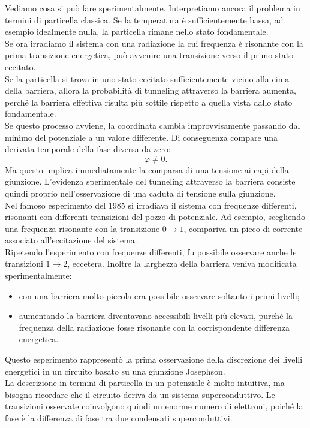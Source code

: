 Vediamo cosa si può fare sperimentalmente. Interpretiamo ancora il problema in termini di particella classica. Se la temperatura è sufficientemente bassa, ad esempio idealmente nulla, la particella rimane nello stato fondamentale.\\
Se ora irradiamo il sistema con una radiazione la cui frequenza è risonante con la prima transizione energetica, può avvenire una transizione verso il primo stato eccitato.\\
Se la particella si trova in uno stato eccitato sufficientemente vicino alla cima della barriera, allora la probabilità di tunneling attraverso la barriera aumenta, perché la barriera effettiva risulta più sottile rispetto a quella vista dallo stato fondamentale.\\
Se questo processo avviene, la coordinata cambia improvvisamente passando dal minimo del potenziale a un valore differente. Di conseguenza compare una derivata temporale della fase diversa da zero:
\[
\dot{\varphi}\neq0.
\]
Ma questo implica immediatamente la comparsa di una tensione ai capi della giunzione. L'evidenza sperimentale del tunneling attraverso la barriera consiste quindi proprio nell'osservazione di una caduta di tensione sulla giunzione.\\
Nel famoso esperimento del 1985 si irradiava il sistema con frequenze differenti, risonanti con differenti transizioni del pozzo di potenziale. Ad esempio, scegliendo una frequenza risonante con la transizione $0\to1$, compariva un picco di corrente associato all'eccitazione del sistema.\\
Ripetendo l'esperimento con frequenze differenti, fu possibile osservare anche le transizioni $1\to2$, eccetera. Inoltre la larghezza della barriera veniva modificata sperimentalmente:
\begin{itemize}[leftmargin=0.5cm]
    \item con una barriera molto piccola era possibile osservare soltanto i primi livelli;
    \item aumentando la barriera diventavano accessibili livelli più elevati, purché la frequenza della radiazione fosse risonante con la corrispondente differenza energetica.
\end{itemize}
Questo esperimento rappresentò la prima osservazione della discrezione dei livelli energetici in un circuito basato su una giunzione Josephson.\\
La descrizione in termini di particella in un potenziale è molto intuitiva, ma bisogna ricordare che il circuito deriva da un sistema superconduttivo. Le transizioni osservate coinvolgono quindi un enorme numero di elettroni, poiché la fase è la differenza di fase tra due condensati superconduttivi.\\

